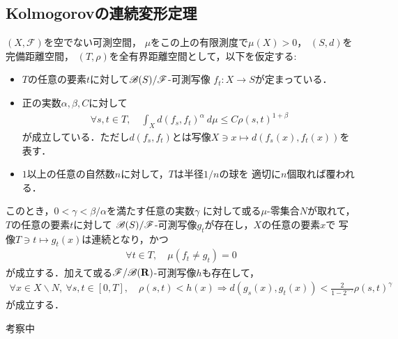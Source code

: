 \subsection{Kolmogorovの連続変形定理}
	\begin{screen}
		\begin{thm}[Kolmogorovの連続変形定理]
			$(X,\mathscr{F})$を空でない可測空間，
			$\mu$をこの上の有限測度で$\mu(X) > 0$，
			$(S,d)$を完備距離空間，
			$(T,\rho)$を全有界距離空間として，以下を仮定する:
			\begin{itemize}
				\item $T$の任意の要素$t$に対して$\mathscr{B}(S)/\mathscr{F}$-可測写像
					$f_t:X \longrightarrow S$が定まっている．
					
				\item 正の実数$\alpha,\beta,C$に対して
					\begin{align}
						\forall s,t \in T,\quad
						\int_X d(f_s,f_t)^\alpha\ d\mu
						\leq C \rho(s,t)^{1+\beta}
					\end{align}
					が成立している．ただし$d(f_s,f_t)$とは写像$X \ni x \longmapsto d(f_s(x),f_t(x))$を表す．
				
				\item $1$以上の任意の自然数$n$に対して，$T$は半径$1/n$の球を
					適切に$n$個取れば覆われる．
			\end{itemize}
			このとき，$0 < \gamma < \beta/\alpha$を満たす任意の実数$\gamma$
			に対して或る$\mu$-零集合$N$が取れて，$T$の任意の要素$t$に対して
			$\mathscr{B}(S)/\mathscr{F}$-可測写像$g_t$が存在し，$X$の任意の要素$x$で
			写像$T \ni t \longmapsto g_t(x)$は連続となり，かつ
			\begin{align}
				\forall t \in T,\quad \mu(f_t \neq g_t) = 0
			\end{align}
			が成立する．加えて或る$\mathscr{F}/\mathscr{B}(\mathbf{R})$-可測写像$h$も存在して，
			\begin{align}
				\forall x \in X \backslash N,\ \forall s,t \in [0,T],\quad
				\rho(s,t) < h(x) \Longrightarrow
				d(g_s(x),g_t(x)) < \frac{2}{1-2^{-\gamma}}\rho(s,t)^\gamma
			\end{align}
			が成立する．
		\end{thm}
	\end{screen}
	
	\begin{prf}
		考察中
	\end{prf}